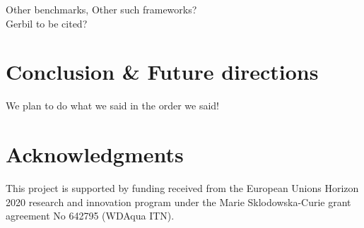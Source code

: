\documentclass{llncs}
\begin{document}
    
    Other benchmarks, Other such frameworks? \\
    Gerbil to be cited?

    
    


\section{Conclusion \& Future directions}
We plan to do what we said in the order we said!
\section*{Acknowledgments}\label{sec:Acknowledgments}
This project is supported by funding received from the European Unions Horizon 2020 research and innovation program under the Marie Sklodowska-Curie grant agreement No 642795 (WDAqua ITN).



\end{document}
